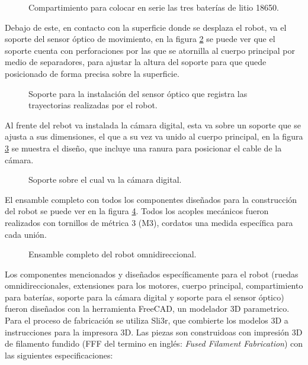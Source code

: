 \documentclass{iccmemoria}
\begin{document}
\begin{figure}[H]
  \centering
  
  \caption[Compartimiento de baterías.]{Compartimiento para colocar en serie las tres baterías de litio 18650.}
  \label{fig:battery_compartment}
\end{figure}

Debajo de este, en contacto con la superficie donde se desplaza el robot, va el soporte del sensor óptico de movimiento, en la figura \ref{fig:mouse_holder} se puede ver que el soporte cuenta con perforaciones por las que se atornilla al cuerpo principal por medio de separadores, para ajustar la altura del soporte para que quede posicionado de forma precisa sobre la superficie.\\

\begin{figure}[H]
  \centering
  
  \caption[Soporte sensor óptico.]{Soporte para la instalación del sensor óptico que registra las trayectorias realizadas por el robot.}
  \label{fig:mouse_holder}
\end{figure}

Al frente del rebot va instalada la cámara digital, esta va sobre un soporte que se ajusta a sus dimensiones, el que a su vez va unido al cuerpo principal, en la figura \ref{fig:camera_holder} se muestra el diseño, que incluye una ranura para posicionar el cable de la cámara.\\

\begin{figure}[H]
  \centering
  
  \caption[Soporte cámara digital.]{Soporte sobre el cual va la cámara digital.}
  \label{fig:camera_holder}
\end{figure}

El ensamble completo con todos los componentes diseñados para la construcción del robot se puede ver en la figura \ref{fig:robot_assembly}. Todos los acoples mecánicos fueron realizados con tornillos de métrica 3 (M3), cordatos una medida específica para cada unión.

\begin{figure}[H]
  \centering
  
  \caption[Ensamble robot omnidireccional.]{Ensamble completo del robot omnidireccional.}
  \label{fig:robot_assembly}
\end{figure}

Los componentes mencionados y diseñados específicamente para el robot (ruedas omnidireccionales, extensiones para los motores, cuerpo principal, compartimiento para baterías, soporte para la cámara digital y soporte para el sensor óptico) fueron diseñados con la herramienta FreeCAD, un modelador 3D parametrico. Para el proceso de fabricación se utiliza Sli3r, que combierte los modelos 3D a instrucciones para la impresora 3D. Las piezas son construidoas con impresión 3D de filamento fundido (FFF del termino en inglés: \emph{Fused Filament Fabrication}) con las siguientes especificaciones:\\
\end{document}

